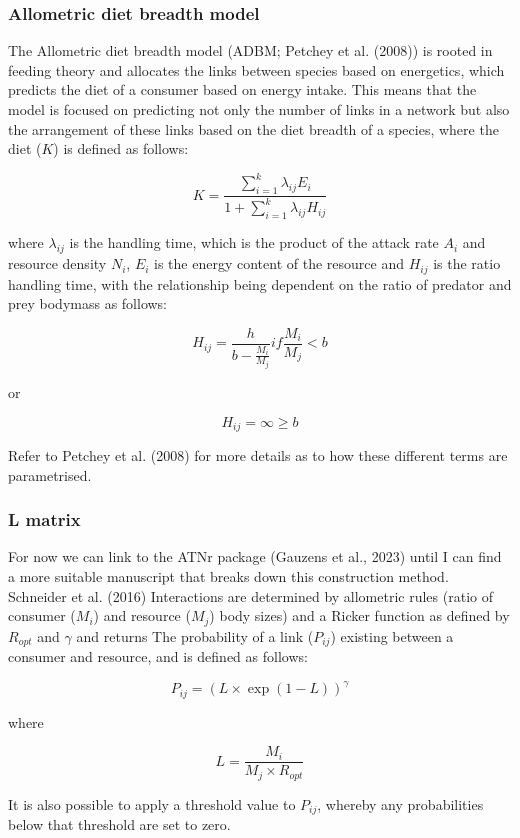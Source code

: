 \documentclass[
]{article}
\begin{document}
\subsubsection{Allometric diet breadth
model}\label{allometric-diet-breadth-model}

The Allometric diet breadth model (ADBM; Petchey et al. (2008)) is
rooted in feeding theory and allocates the links between species based
on energetics, which predicts the diet of a consumer based on energy
intake. This means that the model is focused on predicting not only the
number of links in a network but also the arrangement of these links
based on the diet breadth of a species, where the diet (\(K\)) is
defined as follows:

\[
K = \frac{\sum_{i=1}^{k}\lambda_{ij}E_{i}}{1+\sum_{i=1}^{k}\lambda_{ij}H_{ij}}
\]

where \(\lambda_{ij}\) is the handling time, which is the product of the
attack rate \(A_{i}\) and resource density \(N_{i}\), \(E_{i}\) is the
energy content of the resource and \(H_{ij}\) is the ratio handling
time, with the relationship being dependent on the ratio of predator and
prey bodymass as follows:

\[
H_{ij} = \frac{h}{b - \frac{M_{i}}{M_{j}}} if \frac{M_{i}}{M_{j}} < b
\]

or

\[
H_{ij} = \infty \geq b
\]

Refer to Petchey et al. (2008) for more details as to how these
different terms are parametrised.

\subsubsection{L matrix}\label{l-matrix}

For now we can link to the ATNr package (Gauzens et al., 2023) until I
can find a more suitable manuscript that breaks down this construction
method. Schneider et al. (2016) Interactions are determined by
allometric rules (ratio of consumer (\(M_{i}\)) and resource (\(M_{j}\))
body sizes) and a Ricker function as defined by \(R_{opt}\) and
\(\gamma\) and returns The probability of a link (\(P_{ij}\)) existing
between a consumer and resource, and is defined as follows:

\[
P_{ij} = (L \times \exp(1 - L))^{\gamma}
\]

where

\[
L = \frac{M_{i}}{M_{j} \times R_{opt}}
\]

It is also possible to apply a threshold value to \(P_{ij}\), whereby
any probabilities below that threshold are set to zero.
\end{document}
